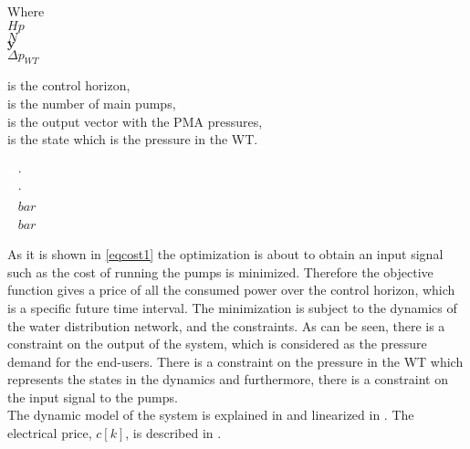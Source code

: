  \begin{minipage}[t]{0.24\textwidth}
 Where\\
 \hspace*{8mm} $Hp$ \\
 \hspace*{8mm} $N$ \\
 \hspace*{8mm} $\pmb{y}$ \\
 \hspace*{8mm} $\Delta p_{WT}$ 
 \end{minipage}
 \begin{minipage}[t]{0.63\textwidth}
 \vspace*{2mm}
 is the control horizon, \\
 is the number of main pumps,\\
 is the output vector with the PMA pressures,\\
 is the state which is the pressure in the WT.
 \end{minipage}
 \begin{minipage}[t]{0.10\textwidth}
 \vspace*{2mm}
 \textcolor{White}{te}$\unit{\cdot}$\\
 \textcolor{White}{te}$\unit{\cdot}$\\
 \textcolor{White}{te}$\unit{bar}$\\
 \textcolor{White}{te}$\unit{bar}$
 \end{minipage}
 
As it is shown in \eqref{eqcost1} the optimization is about to obtain an input signal such as the cost of running the pumps is minimized. Therefore the objective function gives a price of all the consumed power over the control horizon, which is a specific future time interval. The minimization is subject to the dynamics of the water distribution network, and the constraints. As can be seen, there is a constraint on the output of the system, which is considered as the pressure demand for the end-users. There is a constraint on the pressure in the WT which represents the states in the dynamics and furthermore, there is a constraint on the input signal to the pumps. 
\\
The dynamic model of the system is explained in  and linearized in . The electrical price, $c[k]$, is described in . %

